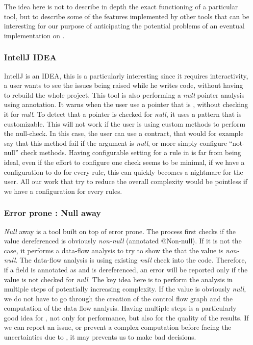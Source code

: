 The idea here is not to describe in depth the exact functioning of a particular tool, but to describe some of the features implemented by other tools that can be interesting for our purpose of anticipating the potential problems of an eventual implementation on \slang{}.

\subsubsection{IntellJ IDEA}
\label{subsubsec:intellj_idea}

IntellJ is an IDEA, this is a particularly interesting since it requires interactivity, a user wants to see the issues being raised while he writes code, without having to rebuild the whole project. 
This tool is also performing a \emph{null} pointer analysis using annotation. 
It warns when the user use a pointer that is \nullable{}, without checking it for \emph{null}. 
To detect that a pointer is checked for \emph{null}, it uses a pattern that is customizable. 
This will not work if the user is using custom methods to perform the null-check. 
In this case, the user can use a contract, that would for example say that this method fail if the argument is \emph{null}, or more simply configure “not-null” check methods.\newline
Having configurable setting for a rule in \slang{} is far from being ideal, even if the effort to configure one check seems to be minimal, if we have a configuration to do for every rule, this can quickly becomes a nightmare for the user. 
All our work that try to reduce the overall complexity would be pointless if we have a configuration for every rules.


\subsubsection{Error prone : Null away}
\label{subsubsec:error_prone}

\emph{Null} away is a tool built on top of error prone. 
The process first checks if the value dereferenced is obviously \emph{non-null} (annotated @Non-null). If it is not the case, it performs a data-flow analysis to try to show the that the value is \emph{non-null}. 
The data-flow analysis is using existing \emph{null} check into the code. 
Therefore, if a field is annotated as \nullable{} and is dereferenced, an error will be reported only if the value is not checked for \emph{null}. 
The key idea here is to perform the analysis in multiple steps of potentially increasing complexity. 
If the value is obviously \emph{null}, we do not have to go through the creation of the control flow graph and the computation of the data flow analysis. 
Having multiple steps is a particularly good idea for \slang{}, not only for performance, but also for the quality of the results. 
If we can report an issue, or prevent a complex computation before facing the uncertainties due to \slang{}, it may prevents us to make bad decisions.

